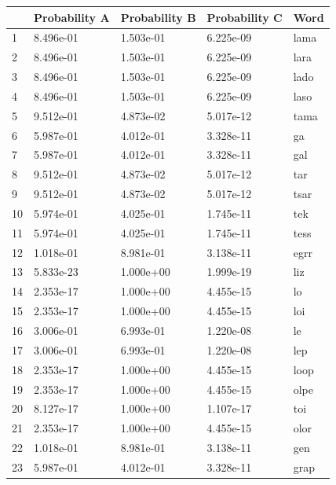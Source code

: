 \begin{table}[!htpb]
  \centering
  \begin{tabular}{lllll}
    \toprule
       & Probability A & Probability B & Probability C & Word \\
    \midrule
    1  & 8.496e-01     & 1.503e-01     & 6.225e-09     & lama \\
    2  & 8.496e-01     & 1.503e-01     & 6.225e-09     & lara \\
    3  & 8.496e-01     & 1.503e-01     & 6.225e-09     & lado \\
    4  & 8.496e-01     & 1.503e-01     & 6.225e-09     & laso \\
    5  & 9.512e-01     & 4.873e-02     & 5.017e-12     & tama \\
    6  & 5.987e-01     & 4.012e-01     & 3.328e-11     & ga   \\
    7  & 5.987e-01     & 4.012e-01     & 3.328e-11     & gal  \\
    8  & 9.512e-01     & 4.873e-02     & 5.017e-12     & tar  \\
    9  & 9.512e-01     & 4.873e-02     & 5.017e-12     & tsar \\
    10 & 5.974e-01     & 4.025e-01     & 1.745e-11     & tek  \\
    11 & 5.974e-01     & 4.025e-01     & 1.745e-11     & tess \\
    12 & 1.018e-01     & 8.981e-01     & 3.138e-11     & egrr \\
    13 & 5.833e-23     & 1.000e+00     & 1.999e-19     & liz  \\
    14 & 2.353e-17     & 1.000e+00     & 4.455e-15     & lo   \\
    15 & 2.353e-17     & 1.000e+00     & 4.455e-15     & loi  \\
    16 & 3.006e-01     & 6.993e-01     & 1.220e-08     & le   \\
    17 & 3.006e-01     & 6.993e-01     & 1.220e-08     & lep  \\
    18 & 2.353e-17     & 1.000e+00     & 4.455e-15     & loop \\
    19 & 2.353e-17     & 1.000e+00     & 4.455e-15     & olpe \\
    20 & 8.127e-17     & 1.000e+00     & 1.107e-17     & toi  \\
    21 & 2.353e-17     & 1.000e+00     & 4.455e-15     & olor \\
    22 & 1.018e-01     & 8.981e-01     & 3.138e-11     & gen  \\
    23 & 5.987e-01     & 4.012e-01     & 3.328e-11     & grap \\

\end{tabular}
\end{table}
